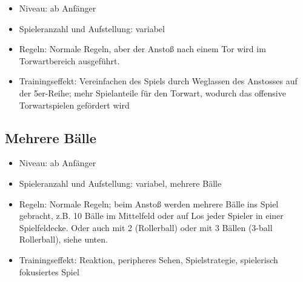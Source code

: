 \begin{itemize}
\item Niveau: ab Anfänger
\item Spieleranzahl und Aufstellung: variabel 
\item Regeln: Normale Regeln, aber der Anstoß nach einem Tor wird im Torwartbereich ausgeführt. 
\item Trainingseffekt: Vereinfachen des Spiels durch Weglassen des Anstosses auf der 5er-Reihe; mehr Spielanteile für den Torwart, wodurch das offensive Torwartspielen  gefördert wird
\end{itemize}

\subsection{Mehrere Bälle}
\label{spielformen:sonderregeln:mehrerebaelle}

\begin{itemize}
\item Niveau: ab Anfänger
\item Spieleranzahl und Aufstellung: variabel, mehrere Bälle 
\item Regeln: Normale Regeln; beim Anstoß werden mehrere Bälle ins Spiel gebracht, z.B. 10 Bälle im Mittelfeld oder auf Los jeder Spieler in einer Spielfeldecke. Oder auch mit 2 (Rollerball) oder mit 3 Bällen (3-ball Rollerball), siehe unten. 
\item Trainingseffekt: Reaktion, peripheres Sehen, Spielstrategie, spielerisch fokusiertes Spiel 
\end{itemize}


